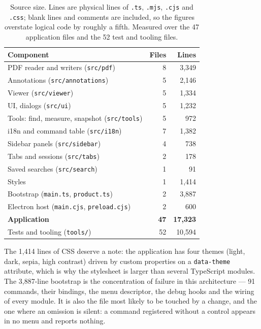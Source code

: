 \begin{table}[t]
  \centering
  \caption{Source size. Lines are physical lines of \texttt{.ts}, \texttt{.mjs},
  \texttt{.cjs} and \texttt{.css}; blank lines and comments are included, so the figures
  overstate logical code by roughly a fifth. Measured over the 47 application files and the
  52 test and tooling files.}
  \label{tab:modules}
  \small
  \begin{tabular}{@{}lrr@{}}
    \toprule
    Component & Files & Lines \\
    \midrule
    PDF reader and writers (\texttt{src/pdf}) & 8 & 3{,}349 \\
    Annotations (\texttt{src/annotations}) & 5 & 2{,}146 \\
    Viewer (\texttt{src/viewer}) & 5 & 1{,}334 \\
    UI, dialogs (\texttt{src/ui}) & 5 & 1{,}232 \\
    Tools: find, measure, snapshot (\texttt{src/tools}) & 5 & 972 \\
    i18n and command table (\texttt{src/i18n}) & 7 & 1{,}382 \\
    Sidebar panels (\texttt{src/sidebar}) & 4 & 738 \\
    Tabs and sessions (\texttt{src/tabs}) & 2 & 178 \\
    Saved searches (\texttt{src/search}) & 1 & 91 \\
    Styles & 1 & 1{,}414 \\
    Bootstrap (\texttt{main.ts}, \texttt{product.ts}) & 2 & 3{,}887 \\
    Electron host (\texttt{main.cjs}, \texttt{preload.cjs}) & 2 & 600 \\
    \midrule
    \textbf{Application} & \textbf{47} & \textbf{17{,}323} \\
    Tests and tooling (\texttt{tools/}) & 52 & 10{,}594 \\
    \bottomrule
  \end{tabular}
\end{table}

The 1{,}414 lines of CSS deserve a note: the application has four themes (light, dark, sepia,
high contrast) driven by custom properties on a \texttt{data-theme} attribute, which is why
the stylesheet is larger than several TypeScript modules. The 3{,}887-line bootstrap is the
concentration of failure in this architecture --- 91 commands, their bindings, the menu
descriptor, the debug hooks and the wiring of every module. It is also the file most likely to
be touched by a change, and the one where an omission is silent: a command registered without a
control appears in no menu and reports nothing.
